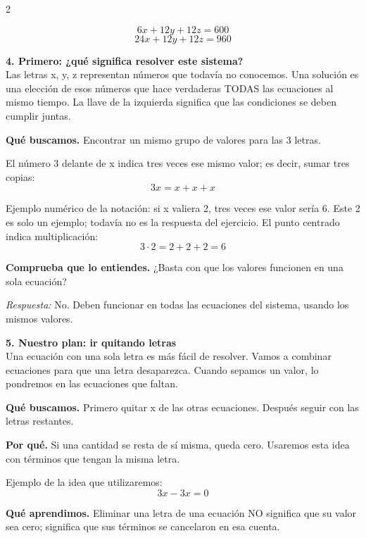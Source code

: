 \documentclass[11pt,a4paper,landscape]{article}
\begin{document}
\begin{multicols*}{2}
\begin{minipage}{\linewidth}
\[6x+12y+12z=600\]
\[24x+12y+12z=960\]
\end{minipage}\par\medskip
\noindent\begin{minipage}{\linewidth}\textbf{4. Primero: ¿qué significa resolver este sistema?}\\[2pt]Las letras x, y, z representan números que todavía no conocemos. Una solución es una elección de esos números que hace verdaderas TODAS las ecuaciones al mismo tiempo. La llave de la izquierda significa que las condiciones se deben cumplir juntas.
\par\smallskip\textbf{Qué buscamos.} Encontrar un mismo grupo de valores para las 3 letras.
\par\smallskip El número 3 delante de x indica tres veces ese mismo valor; es decir, sumar tres copias:
\[3x=x+x+x\]
\par\smallskip Ejemplo numérico de la notación: si x valiera 2, tres veces ese valor sería 6. Este 2 es solo un ejemplo; todavía no es la respuesta del ejercicio. El punto centrado indica multiplicación:
\[3\cdot 2=2+2+2=6\]
\par\smallskip\textbf{Comprueba que lo entiendes.} ¿Basta con que los valores funcionen en una sola ecuación?\par\textit{Respuesta:} No. Deben funcionar en todas las ecuaciones del sistema, usando los mismos valores.
\end{minipage}\par\medskip
\noindent\begin{minipage}{\linewidth}\textbf{5. Nuestro plan: ir quitando letras}\\[2pt]Una ecuación con una sola letra es más fácil de resolver. Vamos a combinar ecuaciones para que una letra desaparezca. Cuando sepamos un valor, lo pondremos en las ecuaciones que faltan.
\par\smallskip\textbf{Qué buscamos.} Primero quitar x de las otras ecuaciones. Después seguir con las letras restantes.
\par\smallskip\textbf{Por qué.} Si una cantidad se resta de sí misma, queda cero. Usaremos esta idea con términos que tengan la misma letra.
\par\smallskip Ejemplo de la idea que utilizaremos:
\[3x-3x=0\]
\par\smallskip\textbf{Qué aprendimos.} Eliminar una letra de una ecuación NO significa que su valor sea cero; significa que sus términos se cancelaron en esa cuenta.
\end{minipage}\par\medskip

\end{multicols*}
\end{document}
